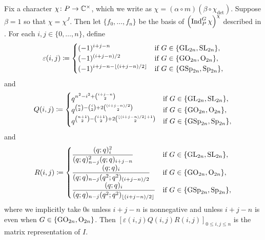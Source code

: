 \begin{proposition} \label{prop:trivial-matrix-coeffs}
	Fix a character $\chi\colon P\to\mathbb C^\times$, which we write as $\chi=(\alpha\circ m)(\beta\circ\chi_{\det})$. Suppose $\beta=1$ so that $\chi=\chi^J$. Then let $\{f_0,\ldots,f_n\}$ be the basis of $\left(\operatorname{Ind}_P^G\chi\right)^\chi$ described in . For each $i,j\in\{0,\ldots,n\}$, define
    \[\varepsilon(i,j)\coloneqq\begin{cases}
        \displaystyle(-1)^{i+j-n} & \text{if }G\in\{\mathrm{GL}_{2n},\mathrm{SL}_{2n}\}, \\
		\displaystyle(-1)^{(i+j-n)/2} & \text{if }G\in\{\mathrm{GO}_{2n},\mathrm{O}_{2n}\}, \\
		\displaystyle(-1)^{i+j-n-\left\lfloor{(i+j-n)/2}\right\rfloor} & \text{if }G\in\{\mathrm{GSp}_{2n},\mathrm{Sp}_{2n}\}, \\
    \end{cases}\]
    and
    \[Q(i,j)\coloneqq\begin{cases}
        q^{n^2-i^2+\binom{i+j-n}2} & \text{if }G\in\{\mathrm{GL}_{2n},\mathrm{SL}_{2n}\}, \\
		q^{\binom{n}2-\binom{i}2+2\binom{(i+j-n)/2}2} & \text{if }G\in\{\mathrm{GO}_{2n},\mathrm{O}_{2n}\}, \\
		q^{\binom{n+1}2-\binom{i+1}2+2\binom{\left\lfloor{(i+j-n)/2}\right\rfloor+1}2} & \text{if }G\in\{\mathrm{GSp}_{2n},\mathrm{Sp}_{2n}\}, \\
    \end{cases}\]
    and
    \[R(i,j)\coloneqq\begin{cases}
        \displaystyle\frac{(q;q)_i^2}{(q;q)_{n-j}^2(q;q)_{i+j-n}} & \text{if }G\in\{\mathrm{GL}_{2n},\mathrm{SL}_{2n}\}, \\
		\displaystyle\frac{(q;q)_i}{(q;q)_{n-j}(q^2;q^2)_{(i+j-n)/2}} & \text{if }G\in\{\mathrm{GO}_{2n},\mathrm{O}_{2n}\}, \\
		\displaystyle\frac{(q;q)_i}{(q;q)_{n-j}(q^2;q^2)_{\left\lfloor{(i+j-n)/2}\right\rfloor}}& \text{if }G\in\{\mathrm{GSp}_{2n},\mathrm{Sp}_{2n}\},
    \end{cases}\]
	where we implicitly take $0$s unless $i+j-n$ is nonnegative and unless $i+j-n$ is even when $G\in\{\mathrm{GO}_{2n},\mathrm{O}_{2n}\}$. Then $[\varepsilon
    (i,j)Q(i,j)R(i,j)]_{0\le i,j\le n}$ is the matrix representation of $I$.
\end{proposition}
